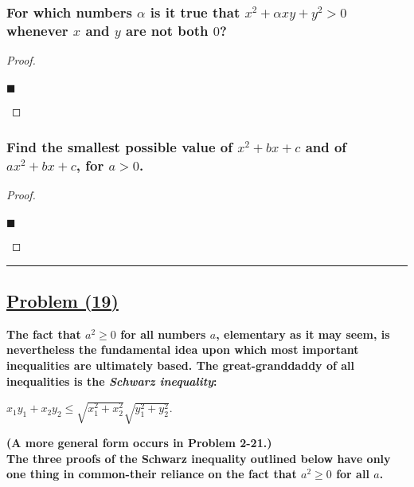 \documentclass[letterpaper, 10 pt, conference]{ieeeconf}  %
\begin{document}
\begin{mdframed}
\subsubsection{\textbf{For which numbers $\alpha$ is it true that $x^2 + \alpha xy + y^2 > 0$ whenever $x$ and $y$ are not both $0$?}}
\end{mdframed}

\begin{proof}
\begin{align}
    
\end{align}
\begin{flushright}
$\blacksquare$
\end{flushright}
\end{proof}

\begin{mdframed}
\subsubsection{\textbf{Find the smallest possible value of $x^2 + bx + c $ and of $ax^2 + bx + c$, for $a > 0$.}}
\end{mdframed}

\begin{proof}
\begin{align}
    
\end{align}
\begin{flushright}
$\blacksquare$
\end{flushright}
\end{proof}

\noindent\rule{8cm}{0.4pt}

\subsection{\textbf{\underline{Problem (19)}}}

\begin{mdframed}
\textbf{The fact that $a^2 \geq 0$ for all numbers $a$, elementary as it may seem, is nevertheless the fundamental idea upon which most important inequalities are ultimately based. The great-granddaddy of all inequalities is the \textit{Schwarz inequality}:}

\begin{center}
    $x_1y_1 + x_2y_2 \leq \sqrt{x_1^2 + x_2^2}\sqrt{y_1^2 + y_2^2}$.
\end{center}

\textbf{(A more general form occurs in Problem 2-21.) \\ The three proofs of the Schwarz inequality outlined below have only one thing in common-their reliance on the fact that $a^2 \geq 0$ for all $a$.}

\end{mdframed}
\end{document}
